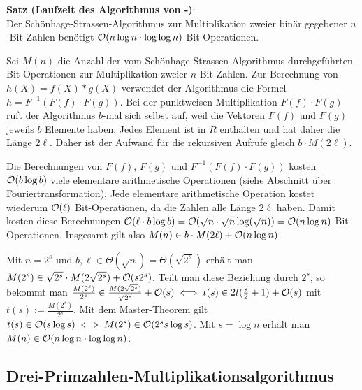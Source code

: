 \linie

\textbf{Satz (Laufzeit des Algorithmus von -)}:\\
Der Schönhage-Strassen-Algorithmus zur Multiplikation zweier binär gegebener $n$-Bit-Zahlen
benötigt $\mathcal{O}(n \log n \cdot \log \log n)$ Bit-Operationen.

\begin{Beweis}
    Sei $M(n)$ die Anzahl der vom Schönhage-Strassen-Algorithmus durchgeführten
    Bit-Operationen zur Multiplikation zweier $n$-Bit-Zahlen.
    Zur Berechnung von $h(X) = f(X) \ast g(X)$ verwendet der Algorithmus die Formel
    $h = F^{-1}(F(f) \cdot F(g))$.
    Bei der punktweisen Multiplikation $F(f) \cdot F(g)$ ruft der Algorithmus $b$-mal sich selbst
    auf, weil die Vektoren $F(f)$ und $F(g)$ jeweils $b$ Elemente haben.
    Jedes Element ist in $R$ enthalten und hat daher die Länge $2\ell$.
    Daher ist der Aufwand für die rekursiven Aufrufe gleich $b \cdot M(2\ell)$.

    Die Berechnungen von $F(f)$, $F(g)$ und $F^{-1}(F(f) \cdot F(g))$ kosten
    $\mathcal{O}(b \log b)$ viele elementare arithmetische Operationen
    (siehe Abschnitt über Fouriertransformation).
    Jede elementare arithmetische Operation kostet wiederum $\mathcal{O}(\ell)$ Bit-Operationen,
    da die Zahlen alle Länge $2\ell$ haben.
    Damit kosten diese Berechnungen
    $\mathcal{O}(\ell \cdot b \log b) = \mathcal{O}(\sqrt{n} \cdot \sqrt{n} \log(\sqrt{n})) = \mathcal{O}(n \log n)$
    Bit-Operationen.
    Insgesamt gilt also $M(n) \in b \cdot M(2\ell) + \mathcal{O}(n \log n)$.

    Mit $n = 2^s$ und $b, \ell \in \Theta(\sqrt{n}) = \Theta(\sqrt{2^s})$ erhält man
    $M(2^s) \in \sqrt{2^s} \cdot M(2\sqrt{2^s}) + \mathcal{O}(s 2^s)$.
    Teilt man diese Beziehung durch $2^s$, so bekommt man
    $\frac{M(2^s)}{2^s} \in \frac{M(2\sqrt{2^s})}{\sqrt{2^s}} + \mathcal{O}(s)
    \iff t(s) \in 2t(\frac{s}{2} + 1) + \mathcal{O}(s)$
    mit $t(s) := \frac{M(2^s)}{2^s}$.
    Mit dem Master-Theorem gilt $t(s) \in \mathcal{O}(s \log s) \iff M(2^s) \in \mathcal{O}(2^s s \log s)$.
    Mit $s = \log n$ erhält man $M(n) \in \mathcal{O}(n \log n \cdot \log \log n)$.
\end{Beweis}

\pagebreak

\subsection{%
    Drei-Primzahlen-Multiplikationsalgorithmus%
}

